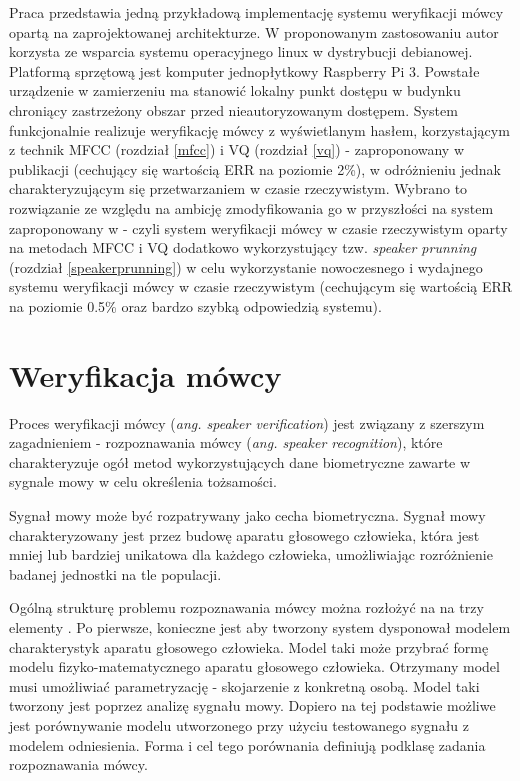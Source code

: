 Praca przedstawia jedną przykładową implementację systemu weryfikacji mówcy opartą na zaprojektowanej architekturze. W proponowanym zastosowaniu autor korzysta ze wsparcia systemu operacyjnego linux w dystrybucji debianowej. Platformą sprzętową jest komputer jednopłytkowy Raspberry Pi 3. Powstałe urządzenie w zamierzeniu ma stanowić lokalny punkt dostępu w budynku chroniący zastrzeżony obszar przed nieautoryzowanym dostępem. System funkcjonalnie realizuje weryfikację mówcy z wyświetlanym hasłem, korzystającym z technik MFCC (rozdział \ref{mfcc}) i VQ (rozdział \ref{vq}) - zaproponowany w publikacji \cite{10digits92} (cechujący się wartością ERR na poziomie 2\%), w odróżnieniu jednak charakteryzującym się przetwarzaniem w czasie rzeczywistym. Wybrano to rozwiązanie ze względu na ambicję zmodyfikowania go w przyszłości na system zaproponowany w \cite{finprunning} - czyli system weryfikacji mówcy w czasie rzeczywistym oparty na metodach MFCC i VQ dodatkowo wykorzystujący tzw. \textit{speaker prunning} (rozdział \ref{speakerprunning}) w celu wykorzystanie nowoczesnego i wydajnego systemu weryfikacji mówcy w czasie rzeczywistym (cechującym się wartością ERR na poziomie 0.5\% oraz bardzo szybką odpowiedzią systemu).

\section{Weryfikacja mówcy}
\label{verification}

Proces weryfikacji mówcy (\textit{ang. speaker verification}) jest związany z szerszym zagadnieniem - rozpoznawania mówcy (\textit{ang. speaker recognition}), które charakteryzuje ogół metod wykorzystujących dane biometryczne zawarte w sygnale mowy w celu określenia tożsamości.

Sygnał mowy może być rozpatrywany jako cecha biometryczna. Sygnał mowy charakteryzowany jest przez budowę aparatu głosowego człowieka, która jest mniej lub bardziej unikatowa dla każdego człowieka, umożliwiając rozróżnienie badanej jednostki na tle populacji.

Ogólną strukturę problemu rozpoznawania mówcy można rozłożyć na na trzy elementy \cite{fosr}. Po pierwsze, konieczne jest aby tworzony system dysponował modelem charakterystyk aparatu głosowego człowieka. Model taki może przybrać formę modelu fizyko-matematycznego aparatu głosowego człowieka. Otrzymany model musi umożliwiać parametryzację - skojarzenie z konkretną osobą. Model taki tworzony jest poprzez analizę sygnału mowy. Dopiero na tej podstawie możliwe jest porównywanie modelu utworzonego przy użyciu testowanego sygnału z modelem odniesienia. Forma i cel tego porównania definiują podklasę zadania rozpoznawania mówcy.

